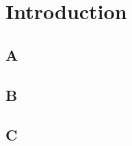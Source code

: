 \chapter{Introduction}\label{ch:introduction}

\section{A}\label{sec:A}
\lipsum[1-5]

\section{B}\label{sec:B}
\lipsum[1-5]

\section{C}\label{sec:C}
\lipsum[1-5]